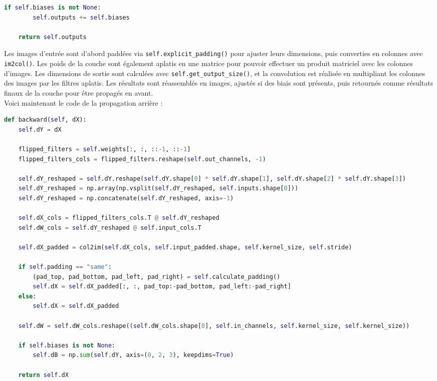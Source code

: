 \begin{multicols}{2}
\begin{lstlisting}[language=Python]
    if self.biases is not None:
        self.outputs += self.biases

    return self.outputs
\end{lstlisting}
\hfill\break

Les images d’entrée sont d’abord paddées via \texttt{self.explicit\_padding()} pour ajuster leurs dimensions, 
puis converties en colonnes avec \texttt{im2col()}. Les poids de la couche sont également aplatis en une 
matrice pour pouvoir effectuer un produit matriciel avec les colonnes d’images. Les dimensions de sortie sont 
calculées avec \texttt{self.get\_output\_size()}, et la convolution est réalisée en multipliant les colonnes des images 
par les filtres aplatis. Les résultats sont réassemblés en images, ajustés si des biais sont 
présents, puis retournés comme résultats finaux de la couche pour être propagés en avant.\\

Voici maintenant le code de la propagation arrière : \\

\begin{lstlisting}[language=Python]
def backward(self, dX):
    self.dY = dX

    flipped_filters = self.weights[:, :, ::-1, ::-1]
    flipped_filters_cols = flipped_filters.reshape(self.out_channels, -1)

    self.dY_reshaped = self.dY.reshape(self.dY.shape[0] * self.dY.shape[1], self.dY.shape[2] * self.dY.shape[3])
    self.dY_reshaped = np.array(np.vsplit(self.dY_reshaped, self.inputs.shape[0]))
    self.dY_reshaped = np.concatenate(self.dY_reshaped, axis=-1)

    self.dX_cols = flipped_filters_cols.T @ self.dY_reshaped
    self.dW_cols = self.dY_reshaped @ self.input_cols.T

    self.dX_padded = col2im(self.dX_cols, self.input_padded.shape, self.kernel_size, self.stride)

    if self.padding == "same":
        (pad_top, pad_bottom, pad_left, pad_right) = self.calculate_padding()
        self.dX = self.dX_padded[:, :, pad_top:-pad_bottom, pad_left:-pad_right]
    else:
        self.dX = self.dX_padded

    self.dW = self.dW_cols.reshape((self.dW_cols.shape[0], self.in_channels, self.kernel_size, self.kernel_size))

    if self.biases is not None:
        self.dB = np.sum(self.dY, axis=(0, 2, 3), keepdims=True)

    return self.dX
\end{lstlisting}
\hfill\break


\end{multicols}
